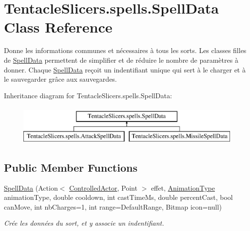 \hypertarget{class_tentacle_slicers_1_1spells_1_1_spell_data}{}\section{Tentacle\+Slicers.\+spells.\+Spell\+Data Class Reference}
\label{class_tentacle_slicers_1_1spells_1_1_spell_data}


Donne les informations communes et nécessaires à tous les sorts. Les classes filles de \hyperlink{class_tentacle_slicers_1_1spells_1_1_spell_data}{Spell\+Data} permettent de simplifier et de réduire le nombre de paramètres à donner. Chaque \hyperlink{class_tentacle_slicers_1_1spells_1_1_spell_data}{Spell\+Data} reçoit un indentifiant unique qui sert à le charger et à le sauvegarder grâce aux sauvegardes.  


Inheritance diagram for Tentacle\+Slicers.\+spells.\+Spell\+Data\+:\begin{figure}[H]
\begin{center}
\leavevmode
\includegraphics[height=2.000000cm]{class_tentacle_slicers_1_1spells_1_1_spell_data}
\end{center}
\end{figure}
\subsection*{Public Member Functions}
\begin{DoxyCompactItemize}
\item 
\hyperlink{class_tentacle_slicers_1_1spells_1_1_spell_data_a3b2b602a51419a4672fb611cf9894957}{Spell\+Data} (Action$<$ \hyperlink{class_tentacle_slicers_1_1actors_1_1_controlled_actor}{Controlled\+Actor}, Point $>$ effet, \hyperlink{namespace_tentacle_slicers_1_1graphics_a9c92bd633d714099730f10897a01950b}{Animation\+Type} animation\+Type, double cooldown, int cast\+Time\+Ms, double percent\+Cast, bool can\+Move, int nb\+Charges=1, int range=Default\+Range, Bitmap icon=null)
\begin{DoxyCompactList}\small\item\em Crée les données du sort, et y associe un indentifiant. \end{DoxyCompactList}\end{DoxyCompactItemize}
